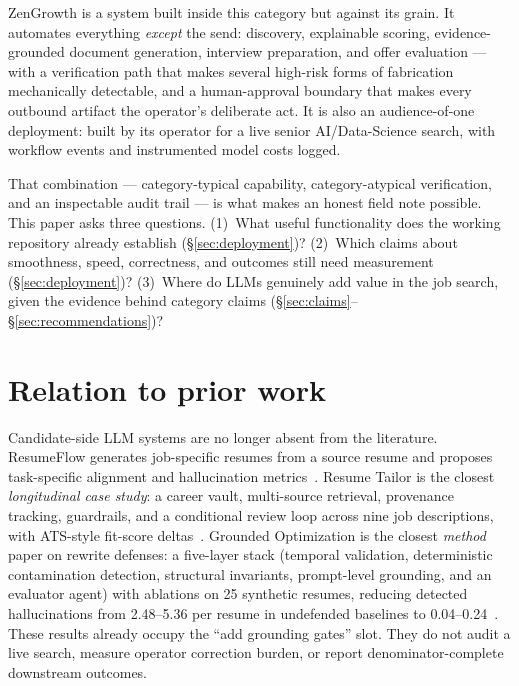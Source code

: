 \documentclass[11pt]{article}
\begin{document}
ZenGrowth is a system built inside this category but against its grain. It
automates everything \emph{except} the send: discovery, explainable scoring,
evidence-grounded document generation, interview preparation, and offer
evaluation --- with a verification path that makes several high-risk forms of
fabrication mechanically detectable, and a human-approval boundary that makes
every outbound artifact the operator's deliberate act. It is also an
audience-of-one deployment: built by its operator for a live senior
AI/Data-Science search, with workflow events and instrumented model costs logged.

That combination --- category-typical capability, category-atypical
verification, and an inspectable audit trail --- is what makes an honest field
note possible. This paper asks three questions. (1)~What useful functionality
does the working repository already establish (\S\ref{sec:deployment})?
(2)~Which claims about smoothness, speed, correctness, and outcomes still need
measurement (\S\ref{sec:deployment})? (3)~Where do LLMs genuinely add value in
the job search, given the evidence behind category claims
(\S\ref{sec:claims}--\S\ref{sec:recommendations})?

\section{Relation to prior work}
\label{sec:priorwork}

Candidate-side LLM systems are no longer absent from the literature.
ResumeFlow generates job-specific resumes from a source resume and proposes
task-specific alignment and hallucination metrics~\citep{zinjad2024resumeflow}.
Resume Tailor is the closest \emph{longitudinal case study}: a career vault,
multi-source retrieval, provenance tracking, guardrails, and a conditional
review loop across nine job descriptions, with ATS-style fit-score
deltas~\citep{abhinav2026career}. Grounded Optimization is the closest
\emph{method} paper on rewrite defenses: a five-layer stack (temporal
validation, deterministic contamination detection, structural invariants,
prompt-level grounding, and an evaluator agent) with ablations on 25
synthetic resumes, reducing detected hallucinations from 2.48--5.36 per resume
in undefended baselines to 0.04--0.24~\citep{indukuri2026grounded}. These
results already occupy the ``add grounding gates'' slot. They do not audit a
live search, measure operator correction burden, or report
denominator-complete downstream outcomes.
\end{document}
